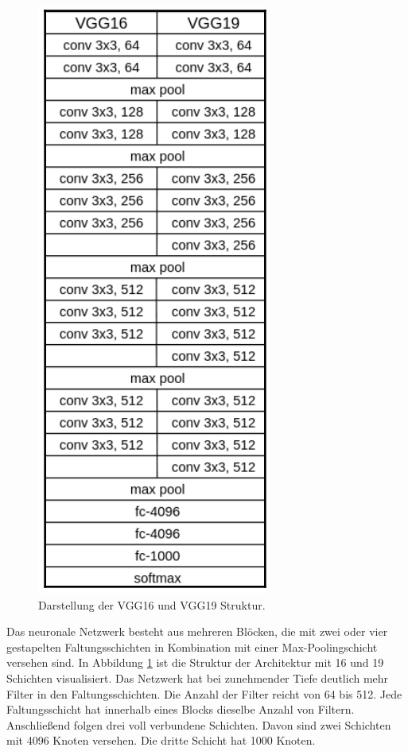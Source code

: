\begin{figure}
	\centering
	\includegraphics[width=0.18\textheight]{bilder/vgg19.PNG}
	\caption{Darstellung der VGG16 und VGG19 Struktur\cite{Vasilev2019}.}
	\label{VGG19_arch}
\end{figure}

Das neuronale Netzwerk besteht aus mehreren Blöcken, die mit zwei oder vier gestapelten Faltungsschichten in Kombination mit einer Max-Poolingschicht versehen sind. In Abbildung \ref{VGG19_arch} ist die Struktur der Architektur mit 16 und 19 Schichten visualisiert. Das Netzwerk hat bei zunehmender Tiefe deutlich mehr Filter in den Faltungsschichten. Die Anzahl der Filter reicht von 64 bis 512. Jede Faltungsschicht hat innerhalb eines Blocks dieselbe Anzahl von Filtern. Anschließend folgen drei voll verbundene Schichten. Davon sind zwei Schichten mit 4096 Knoten versehen. Die dritte Schicht hat 1000 Knoten\cite{Vasilev2019}. 


